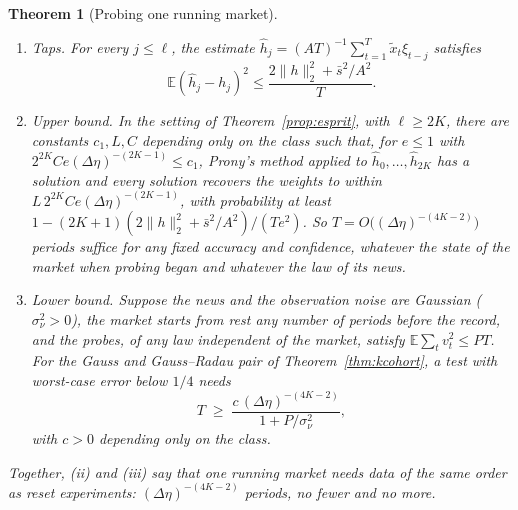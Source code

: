 \documentclass[12pt]{article}
\newtheorem{theorem}{Theorem}[section]
\theoremstyle{definition}
\theoremstyle{remark}
\begin{document}
\begin{theorem}[Probing one running market]\label{thm:running}
\begin{enumerate}[label=(\roman*),itemsep=1pt]
\item \emph{Taps.} For every $j\le\ell$, the estimate $\hat h_j=(AT)^{-1}\sum_{t=1}^T\tilde x_t\xi_{t-j}$ satisfies
\[
\mathbb E(\hat h_j-h_j)^2\le\frac{2\|h\|_2^2+\bar s^2/A^2}{T}.
\]
\item \emph{Upper bound.} In the setting of Theorem~\ref{prop:esprit}, with $\ell\ge2K$, there are constants $c_1,L,C$ depending only on the class such that, for $e\le1$ with $2^{2K}Ce(\Delta\eta)^{-(2K-1)}\le c_1$, Prony's method applied to $\hat h_0,\ldots,\hat h_{2K}$ has a solution and every solution recovers the weights to within $L\,2^{2K}Ce(\Delta\eta)^{-(2K-1)}$, with probability at least $1-(2K+1)(2\|h\|_2^2+\bar s^2/A^2)/(Te^2)$. So $T=O\bigl((\Delta\eta)^{-(4K-2)}\bigr)$ periods suffice for any fixed accuracy and confidence, whatever the state of the market when probing began and whatever the law of its news.
\item \emph{Lower bound.} Suppose the news and the observation noise are Gaussian ($\sigma_\nu^2>0$), the market starts from rest any number of periods before the record, and the probes, of any law independent of the market, satisfy $\mathbb E\sum_tv_t^2\le PT$. For the Gauss and Gauss--Radau pair of Theorem~\ref{thm:kcohort}, a test with worst-case error below $1/4$ needs
\[
T\;\ge\;\frac{c\,(\Delta\eta)^{-(4K-2)}}{1+P/\sigma_\nu^2},
\]
with $c>0$ depending only on the class.
\end{enumerate}
Together, (ii) and (iii) say that one running market needs data of the same order as reset experiments: $(\Delta\eta)^{-(4K-2)}$ periods, no fewer and no more.
\end{theorem}
\end{document}
